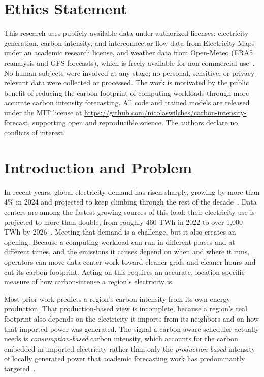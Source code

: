 \documentclass[sigconf,nonacm,a4paper]{acmart}  %
\begin{document}
\section*{Ethics Statement}
This research uses publicly available data under authorized licenses: electricity
generation, carbon intensity, and interconnector flow data from Electricity Maps
under an academic research license, and weather data from Open-Meteo (ERA5
reanalysis and GFS forecasts), which is freely available for non-commercial
use~\cite{openmeteo,hersbach2020era5,noaagfs}. No human subjects were involved at
any stage; no personal, sensitive, or privacy-relevant data were collected or
processed. The work is motivated by the public benefit of reducing the carbon
footprint of computing workloads through more accurate carbon intensity forecasting.
All code and trained models are released under the MIT license at
\url{https://github.com/nicolaswilches/carbon-intensity-forecast}, supporting open
and reproducible science. The authors declare no conflicts of interest.

\section{Introduction and Problem}
In recent years, global electricity demand has risen sharply, growing by more than
4\% in 2024 and projected to keep climbing through the rest of the decade~\cite{iea2024electricity}.
Data centers are among the fastest-growing sources of this load: their electricity
use is projected to more than double, from roughly 460 TWh in 2022 to over
1{,}000 TWh by 2026~\cite{iea2024electricity}. Meeting that demand is a challenge, but it also creates
an opening. Because a computing workload can run in different places and at
different times, and the emissions it causes depend on when and where it runs,
operators can move data center work toward cleaner grids and cleaner hours and cut
its carbon footprint. Acting on this requires an accurate, location-specific
measure of how carbon-intense a region's electricity is.

Most prior work predicts a region's carbon intensity from its own energy
production. That production-based view is incomplete, because a region's real
footprint also depends on the electricity it imports from its neighbors and on how
that imported power was generated. The signal a carbon-aware scheduler actually
needs is \emph{consumption-based} carbon intensity, which accounts for the carbon
embedded in imported electricity rather than only the \emph{production-based}
intensity of locally generated power that academic forecasting work has predominantly targeted~\cite{maji2022carboncast,yan2025ensembleci}.
\end{document}
